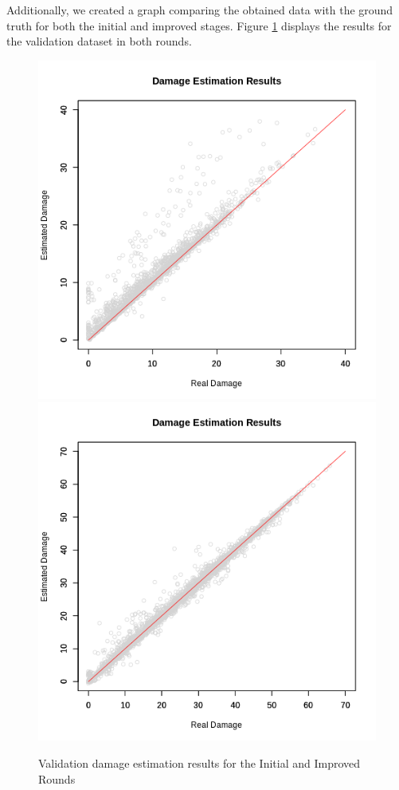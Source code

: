 Additionally, we created a graph comparing the obtained data with the ground truth for both the initial and improved stages. Figure \ref{fig:validation_results} displays the results for the validation dataset in both rounds.

\begin{figure}[h!]
    \centering
    \includegraphics[width = .45\linewidth]{Figures/v1-val-estm.png}
    \includegraphics[width = .45\linewidth]{Figures/v2-val-estm.png}
    \caption{Validation damage estimation results for the Initial and Improved Rounds}
    \label{fig:validation_results}
\end{figure}

